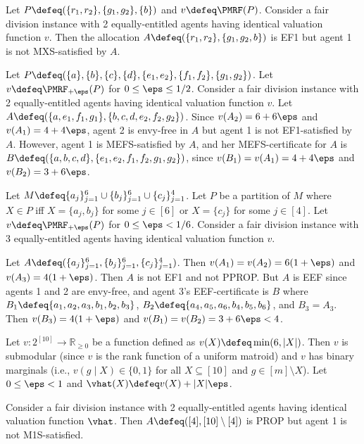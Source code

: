 \begin{example}
\label{cex:ef1-not-mxs-pmrf}
Let $P \defeq (\{r_1, r_2\}, \{g_1, g_2\}, \{b\})$ and $v \defeq \PMRF(P)$.
Consider a fair division instance with 2 equally-entitled agents
having identical valuation function $v$.
Then the allocation $A \defeq (\{r_1, r_2\}, \{g_1, g_2, b\})$ is EF1
but agent 1 is not MXS-satisfied by $A$.
\end{example}

\begin{example}
\label{cex:mefs-not-ef1-pmrf}
Let $P \defeq (\{a\}, \{b\}, \{c\}, \{d\}, \{e_1, e_2\}, \{f_1, f_2\}, \{g_1, g_2\})$.
Let $v \defeq \PMRF_{+\eps}(P)$ for $0 \le \eps \le 1/2$.
Consider a fair division instance with 2 equally-entitled agents
having identical valuation function $v$.
Let $A \defeq (\{a, e_1, f_1, g_1\}, \{b, c, d, e_2, f_2, g_2\})$.
Since $v(A_2) = 6 + 6\eps$ and $v(A_1) = 4 + 4\eps$,
agent 2 is envy-free in $A$ but agent 1 is not EF1-satisfied by $A$.
However, agent 1 is MEFS-satisfied by $A$, and her MEFS-certificate for $A$ is
$B \defeq (\{a, b, c, d\}, \{e_1, e_2, f_1, f_2, g_1, g_2\})$,
since $v(B_1) = v(A_1) = 4 + 4\eps$ and $v(B_2) = 3 + 6\eps$.
\end{example}

\begin{example}
\label{cex:eef-not-ef1-pprop-pmrf}
Let $M \defeq \{a_j\}_{j=1}^6 \cup \{b_j\}_{j=1}^6 \cup \{c_j\}_{j=1}^4$.
Let $P$ be a partition of $M$ where $X \in P$ iff $X = \{a_j, b_j\}$ for some $j \in [6]$
or $X = \{c_j\}$ for some $j \in [4]$.
Let $v \defeq \PMRF_{+\eps}(P)$ for $0 \le \eps < 1/6$.
Consider a fair division instance with 3 equally-entitled agents
having identical valuation function $v$.

Let $A \defeq (\{a_j\}_{j=1}^6, \{b_j\}_{j=1}^6, \{c_j\}_{j=1}^4)$.
Then $v(A_1) = v(A_2) = 6(1+\eps)$ and $v(A_3) = 4(1+\eps)$.
Then $A$ is not EF1 and not PPROP.
But $A$ is EEF since agents 1 and 2 are envy-free,
and agent 3's EEF-certificate is $B$ where
$B_1 \defeq \{a_1, a_2, a_3, b_1, b_2, b_3\}$,
$B_2 \defeq \{a_4, a_5, a_6, b_4, b_5, b_6\}$, and $B_3 = A_3$.
Then $v(B_3) = 4(1+\eps)$ and $v(B_1) = v(B_2) = 3 + 6\eps < 4$.
\end{example}

\begin{example}
\label{cex:prop-not-m1s-uniform-matroid}
Let $v: 2^{[10]} \to \mathbb{R}_{\ge 0}$ be a function defined as $v(X) \defeq \min(6, |X|)$.
Then $v$ is submodular (since $v$ is the rank function of a uniform matroid)
and $v$ has binary marginals (i.e., $v(g \mid X) \in \{0, 1\}$
for all $X \subseteq [10]$ and $g \in [m] \setminus X$).
Let $0 \le \eps < 1$ and $\vhat(X) \defeq v(X) + |X|\eps$.

Consider a fair division instance with 2 equally-entitled agents
having identical valuation function $\vhat$.
Then $A \defeq ([4], [10] \setminus [4])$ is PROP but agent 1 is not M1S-satisfied.
\end{example}

